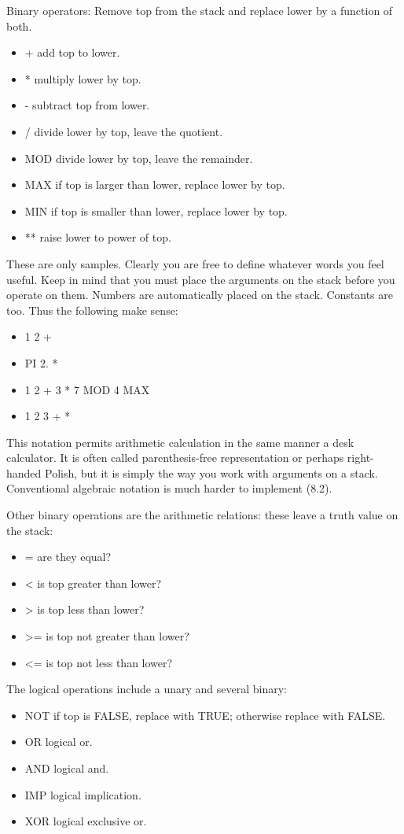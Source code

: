 \documentclass[b5paper, oneside]{book}
\begin{document}
Binary operators: Remove top from the stack and replace lower by a function of both.\begin{itemize}
   \item + add top to lower.
   \item * multiply lower by top.
   \item - subtract top from lower.
   \item / divide lower by top, leave the quotient.
   \item MOD divide lower by top, leave the remainder.
   \item MAX if top is larger than lower, replace lower by top.
   \item MIN if top is smaller than lower, replace lower by top.
   \item ** raise lower to power of top.\end{itemize}

These are only samples. Clearly you are free to define whatever words you feel useful. Keep in mind that you must place the arguments on the stack before you operate on them. Numbers are automatically placed on the stack. Constants are too. Thus the following make sense:\begin{itemize}
   \item 1 2 +
   \item PI 2. *
   \item 1 2 + 3 * 7 MOD 4 MAX
   \item 1 2 3 + *\end{itemize}

This notation permits arithmetic calculation in the same manner a desk calculator. It is often called parenthesis-free representation or perhaps right-handed Polish, but it is simply the way you work with arguments on a stack. Conventional algebraic notation is much harder to implement (8.2).

Other binary operations are the arithmetic relations: these leave a truth value on the stack:\begin{itemize}
   \item = are they equal?
   \item < is top greater than lower?
   \item > is top less than lower?
   \item >= is top not greater than lower?
   \item <= is top not less than lower?\end{itemize}

The logical operations include a unary and several binary:\begin{itemize}
   \item NOT if top is FALSE, replace with TRUE; otherwise replace with FALSE.
   \item OR logical or.
   \item AND logical and.
   \item IMP logical implication.
   \item XOR logical exclusive or.\end{itemize}
\end{document}
